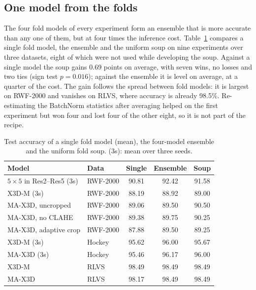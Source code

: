 \documentclass[runningheads]{llncs}
\begin{document}
\subsection{One model from the folds}
\label{sec:soup-result}

The four fold models of every experiment form an ensemble that is more
accurate than any one of them, but at four times the inference cost.
Table~\ref{tab:soup} compares a single fold model, the ensemble and the
uniform soup on nine experiments over three datasets, eight of which were
not used while developing the soup. Against a single model the soup gains
0.69 points on average, with seven wins, no losses and two ties (sign test
$p=0.016$); against the ensemble it is level on average, at a quarter of
the cost. The gain follows the spread between fold models: it is largest on
RWF-2000 and vanishes on RLVS, where accuracy is already 98.5\%.
Re-estimating the BatchNorm statistics after averaging helped on the first
experiment but won four and lost four of the other eight, so it is not part
of the recipe.

\begin{table}[t]
\centering
\caption{Test accuracy of a single fold model (mean), the four-model
ensemble and the uniform fold soup. (3s): mean over three seeds.}
\label{tab:soup}
\setlength{\tabcolsep}{5pt}
\begin{tabular}{llccc}
\toprule
Model & Data & Single & Ensemble & Soup \\
\midrule
$5\times5$ in Res2--Res5 (3s) & RWF-2000 & 90.81 & 92.42 & 91.58 \\
X3D-M (3s)                    & RWF-2000 & 88.19 & 88.92 & 89.00 \\
MA-X3D, uncropped             & RWF-2000 & 89.06 & 89.50 & 90.50 \\
MA-X3D, no CLAHE              & RWF-2000 & 89.38 & 89.75 & 90.25 \\
MA-X3D, adaptive crop         & RWF-2000 & 87.88 & 89.50 & 89.25 \\
X3D-M (3s)                    & Hockey   & 95.62 & 96.00 & 95.67 \\
MA-X3D (3s)                   & Hockey   & 95.46 & 96.17 & 96.00 \\
X3D-M                         & RLVS     & 98.49 & 98.49 & 98.49 \\
MA-X3D                        & RLVS     & 98.17 & 98.49 & 98.49 \\
\bottomrule
\end{tabular}
\end{table}
\end{document}
